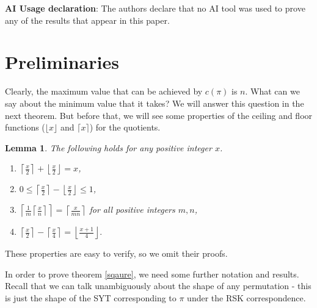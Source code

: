 \documentclass[11pt, a4paper]{article}
\theoremstyle{compact}
\newtheorem{lemma}[theorem]{Lemma}
\begin{document}
\textbf{AI Usage declaration}: The authors declare that no AI tool was used to prove any of the results that appear in this paper.

\section{Preliminaries}
Clearly, the maximum value that can be achieved by $c(\pi)$ is $n$. What can we say about the minimum value that it takes? We will answer this question in the next theorem. But before that, we will see some properties of the ceiling and floor functions ($\lfloor x \rfloor$ and $\lceil x \rceil$) for the quotients. 
\begin{lemma}
    The following holds for any positive integer $x$.
    \begin{enumerate}
        \item $\displaystyle \left\lceil \frac{x}{2} \right\rceil + \left\lfloor \frac{x}{2} \right\rfloor = x $,
        \item $\displaystyle 0 \leq \left\lceil \frac{x}{2}\right\rceil -  \left\lfloor \frac{x}{2} \right\rfloor \leq 1$,
        \item $\displaystyle \left\lceil\frac{1}{m} \left\lceil \frac{x}{n}\right\rceil \right\rceil = \left\lceil \frac{x}{mn} \right\rceil$ for all positive integers $m, n$, \label{floor_floor 3}
        \item $\displaystyle \left\lceil\frac{x}{2}\right\rceil - \left\lceil\frac{x}{4}\right\rceil = \left\lfloor\frac{x+1}{4}\right\rfloor.$  \label{floor_ceil_5}
    \end{enumerate}
\end{lemma}
These properties are easy to verify, so we omit their proofs. 

 In order to prove theorem \ref{sqaure}, we need some further notation and results. Recall that we can talk unambiguously about the shape of any permutation - this is just the shape of the SYT corresponding to $\pi$ under the RSK correspondence. \\
 
\end{document}
